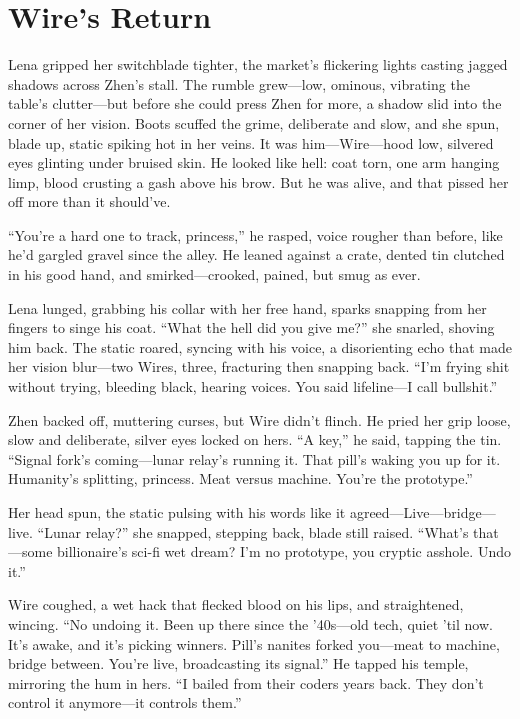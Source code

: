 \documentclass[12pt]{book}
\begin{document}
\section{Wire's Return}

Lena gripped her switchblade tighter, the market’s flickering lights casting jagged shadows across Zhen’s stall. The rumble grew---low, ominous, vibrating the table’s clutter---but before she could press Zhen for more, a shadow slid into the corner of her vision. Boots scuffed the grime, deliberate and slow, and she spun, blade up, static spiking hot in her veins. It was him---Wire---hood low, silvered eyes glinting under bruised skin. He looked like hell: coat torn, one arm hanging limp, blood crusting a gash above his brow. But he was alive, and that pissed her off more than it should’ve.

``You're a hard one to track, princess,'' he rasped, voice rougher than before, like he'd gargled gravel since the alley. He leaned against a crate, dented tin clutched in his good hand, and smirked---crooked, pained, but smug as ever.

Lena lunged, grabbing his collar with her free hand, sparks snapping from her fingers to singe his coat. ``What the hell did you give me?'' she snarled, shoving him back. The static roared, syncing with his voice, a disorienting echo that made her vision blur---two Wires, three, fracturing then snapping back. ``I'm frying shit without trying, bleeding black, hearing voices. You said lifeline---I call bullshit.''

Zhen backed off, muttering curses, but Wire didn’t flinch. He pried her grip loose, slow and deliberate, silver eyes locked on hers. ``A key,'' he said, tapping the tin. ``Signal fork's coming---lunar relay's running it. That pill's waking you up for it. Humanity's splitting, princess. Meat versus machine. You're the prototype.''

Her head spun, the static pulsing with his words like it agreed---Live---bridge---live. ``Lunar relay?'' she snapped, stepping back, blade still raised. ``What's that---some billionaire's sci-fi wet dream? I'm no prototype, you cryptic asshole. Undo it.''

Wire coughed, a wet hack that flecked blood on his lips, and straightened, wincing. ``No undoing it. Been up there since the '40s---old tech, quiet 'til now. It's awake, and it's picking winners. Pill's nanites forked you---meat to machine, bridge between. You're live, broadcasting its signal.'' He tapped his temple, mirroring the hum in hers. ``I bailed from their coders years back. They don't control it anymore---it controls them.''
\end{document}
